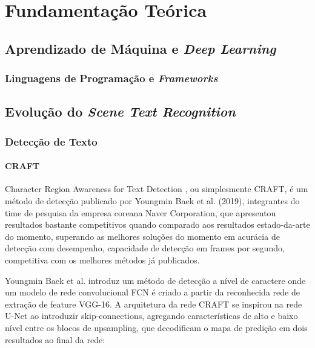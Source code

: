 \chapter{Fundamentação Teórica}

\lipsum[43-45]

\section{Aprendizado de Máquina e \textit{Deep Learning}}
\lipsum[45]
\subsection{Linguagens de Programação e \textit{Frameworks}}
\lipsum[45]

\section{Evolução do \textit{Scene Text Recognition}}
\lipsum[45]
\subsection{Detecção de Texto}
\lipsum[25]

\subsubsection{CRAFT}\label{craft}
Character Region Awareness for Text Detection \cite{CRAFT}, ou simplesmente CRAFT, é um método de detecção publicado por Youngmin Baek et al. (2019), integrantes do time de pesquisa da empresa coreana Naver Corporation\cite{NaverCorp}, que apresentou resultados bastante competitivos quando comparado aos resultados estado-da-arte do momento, superando as melhores soluções do momento em acurácia de detecção com desempenho, capacidade de detecção em frames por segundo, competitiva com os melhores métodos já publicados.
	
Youngmin Baek et al. introduz um método de detecção a nível de caractere onde um modelo de rede convolucional FCN é criado a partir da reconhecida rede de extração de feature VGG-16\cite{VGG}. A arquitetura da rede CRAFT se inspirou na rede U-Net \cite{UNET} ao introduzir skip-connections, agregando características de alto e baixo nível entre os blocos de upsampling, que decodificam o mapa de predição em dois resultados ao final da rede:

